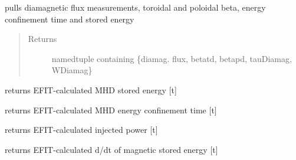 \documentclass[letterpaper,10pt,english]{sphinxmanual}
\begin{document}
\begin{fulllineitems}
\begin{fulllineitems}
\label{eqtools:eqtools.EFIT.EFITTree.getDiamag}
pulls diamagnetic flux measurements, toroidal and poloidal beta, energy confinement time and stored energy
\begin{quote}\begin{description}
\item[{Returns}] \leavevmode
namedtuple containing \{diamag. flux, betatd, betapd, tauDiamag, WDiamag\}

\end{description}\end{quote}

\end{fulllineitems}


\begin{fulllineitems}
\label{eqtools:eqtools.EFIT.EFITTree.getWMHD}
returns EFIT-calculated MHD stored energy {[}t{]}

\end{fulllineitems}


\begin{fulllineitems}
\label{eqtools:eqtools.EFIT.EFITTree.getTauMHD}
returns EFIT-calculated MHD energy confinement time {[}t{]}

\end{fulllineitems}


\begin{fulllineitems}
\label{eqtools:eqtools.EFIT.EFITTree.getPinj}
returns EFIT-calculated injected power {[}t{]}

\end{fulllineitems}


\begin{fulllineitems}
\label{eqtools:eqtools.EFIT.EFITTree.getWbdot}
returns EFIT-calculated d/dt of magnetic stored energy {[}t{]}

\end{fulllineitems}


\end{fulllineitems}
\end{document}
